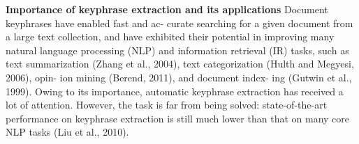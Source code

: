 \textbf{Importance of keyphrase extraction and its applications}
Document keyphrases have enabled fast and ac- curate searching for a given document from a large text collection, and have exhibited their potential in improving many natural language processing (NLP) and information retrieval (IR) tasks, such as text summarization (Zhang et al., 2004), text categorization (Hulth and Megyesi, 2006), opin- ion mining (Berend, 2011), and document index- ing (Gutwin et al., 1999). \cite{KeyphraseSurvey}
\newline
Owing to its importance, automatic keyphrase extraction has received a lot of attention. However, the task is far from being solved: state-of-the-art performance on keyphrase extraction is still much lower than that on many core NLP tasks (Liu et al., 2010).\cite{KeyphraseSurvey}

